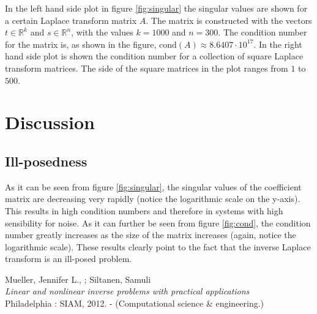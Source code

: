 \documentclass[12pt,a4]{article}
\newcommand{\R}{{\mathbb R}}
\newcommand{\cond}{\ensuremath{\text{cond}}}
\begin{document}
In the left hand side plot in figure \ref{fig:singular} the singular values are shown for a certain Laplace transform matrix $A$. The matrix is constructed with the vectors $t \in \R^k$ and $s \in \R^n$, with the values $k = 1000$ and $n = 300$. The condition number for the matrix is, as shown in the figure, $\cond(A) \approx 8.6407 \cdot 10^{17}$. In the right hand side plot is shown the condition number for a collection of square Laplace transform matrices. The side of the square matrices in the plot ranges from $1$ to $500$.





\section{Discussion}

\subsection{Ill-posedness}

As it can be seen from figure \ref{fig:singular}, the singular values of the coefficient matrix are decreasing very rapidly (notice the logarithmic scale on the y-axis). This results in high condition numbers and therefore in systems with high sensibility for noise. As it can further be seen from figure \ref{fig:cond}, the condition number greatly increases as the size of the matrix increases (again, notice the logarithmic scale). These results clearly point to the fact that the inverse Laplace transform is an ill-posed problem.


\newpage
\begin{thebibliography}{9}

Mueller, Jennifer L., ; Siltanen, Samuli \\
\emph{Linear and nonlinear inverse problems with practical applications} \\ Philadelphia : SIAM, 2012. - (Computational science \& engineering.)

\end{thebibliography}
\end{document}
